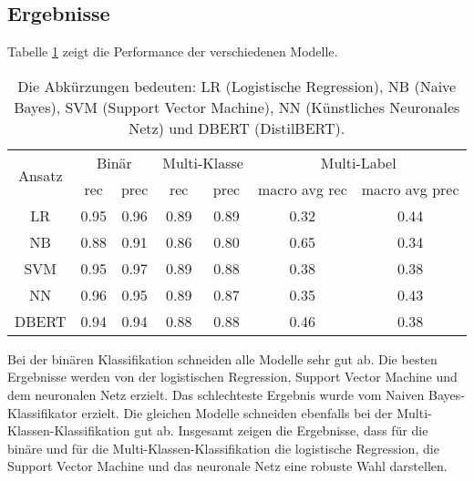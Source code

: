 \subsection{Ergebnisse}
Tabelle \ref{tab:ergebnisse} zeigt die Performance der verschiedenen Modelle.
\begin{table}[ht]
    \centering
    \begin{tabular}{|c|c|c|c|c|c|c|}
        \hline
        \multirow{2}{*}{Ansatz} & \multicolumn{2}{c|}{Binär} & \multicolumn{2}{c|}{Multi-Klasse} & \multicolumn{2}{c|}{Multi-Label}                                         \\
        \cline{2-7}
                                & rec                        & prec                              & rec                              & prec & macro avg rec & macro avg prec \\
        \hline
        LR                      & 0.95                       & 0.96                              & 0.89                             & 0.89 & 0.32          & 0.44           \\
        \hline
        NB                      & 0.88                       & 0.91                              & 0.86                             & 0.80 & 0.65          & 0.34           \\
        \hline
        SVM                     & 0.95                       & 0.97                              & 0.89                             & 0.88 & 0.38          & 0.38           \\
        \hline
        NN                      & 0.96                       & 0.95                              & 0.89                             & 0.87 & 0.35          & 0.43           \\
        \hline
        DBERT                   & 0.94                       & 0.94                              & 0.88                             & 0.88 & 0.46          & 0.38           \\
        \hline
    \end{tabular}
    \caption{Die Abkürzungen bedeuten: LR (Logistische Regression), NB (Naive Bayes), SVM (Support Vector Machine), NN (Künstliches Neuronales Netz) und DBERT (DistilBERT).}
    \label{tab:ergebnisse}
\end{table}

Bei der binären Klassifikation schneiden alle Modelle sehr gut ab. Die besten Ergebnisse werden von der logistischen Regression, Support Vector Machine und dem neuronalen Netz erzielt. Das schlechteste Ergebnis wurde vom Naiven Bayes-Klassifikator erzielt. Die gleichen Modelle schneiden ebenfalls bei der Multi-Klassen-Klassifikation gut ab. Insgesamt zeigen die Ergebnisse, dass für die binäre und für die Multi-Klassen-Klassifikation die logistische Regression, die Support Vector Machine und das neuronale Netz eine robuste Wahl darstellen.

